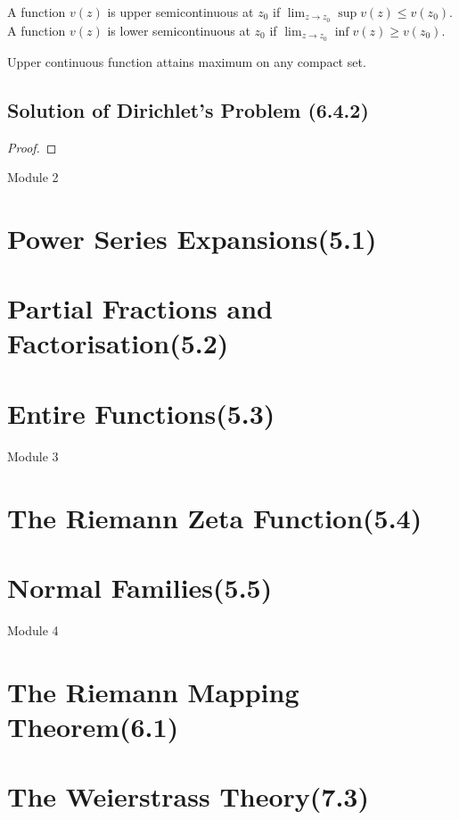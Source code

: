 \begin{definition}[semicontinuous]
	A function $v(z)$ is upper semicontinuous at $z_0$ if $\displaystyle \lim_{z \to z_0} \sup v(z) \le v(z_0)$.
	A function $v(z)$ is lower semicontinuous at $z_0$ if $\displaystyle \lim_{z \to z_0} \inf v(z) \ge v(z_0)$.
\end{definition}

\begin{remark}
	Upper continuous function attains maximum on any compact set.
\end{remark}

\subsection{Solution of Dirichlet's Problem (6.4.2)}
\begin{theorem}
\end{theorem}
\begin{proof}
\end{proof}
\pagebreak
{\Large Module 2}
\section{Power Series Expansions(5.1)}
\section{Partial Fractions and Factorisation(5.2)}
\section{Entire Functions(5.3)}
\pagebreak
{\Large Module 3}
\section{The Riemann Zeta Function(5.4)}
\section{Normal Families(5.5)}
\pagebreak
{\Large Module 4}
\section{The Riemann Mapping Theorem(6.1)}
\section{The Weierstrass Theory(7.3)}
